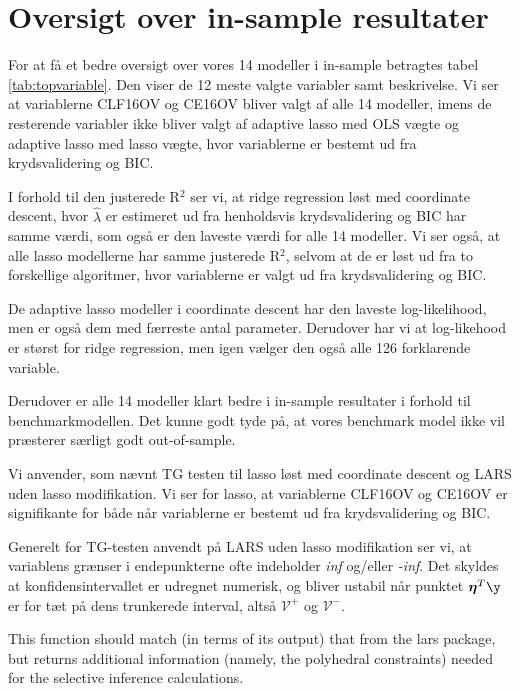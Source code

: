 \section{Oversigt over in-sample resultater} 
For at få et bedre oversigt over vores 14 modeller i in-sample betragtes tabel \ref{tab:topvariable}. Den viser de 12 meste valgte variabler samt beskrivelse. Vi ser at variablerne \textcolor{blue3}{CLF16OV} og \textcolor{blue3}{CE16OV} bliver valgt af alle 14 modeller, imens de resterende variabler ikke bliver valgt af adaptive lasso med OLS vægte og adaptive lasso med lasso vægte, hvor variablerne er bestemt ud fra  krydsvalidering og BIC. 



I forhold til den justerede R$^2$ ser vi, at ridge regression løst med coordinate descent, hvor $\widehat{\lambda}$ er estimeret ud fra henholdsvis krydsvalidering og BIC har samme værdi, som også er den laveste værdi for alle 14 modeller. 
Vi ser også, at alle lasso modellerne har samme justerede R$^2$, selvom at de er løst ud fra to forskellige algoritmer, hvor variablerne er valgt ud fra krydsvalidering og BIC. 

De adaptive lasso modeller i coordinate descent har den laveste log-likelihood, men er også dem med færreste antal parameter. Derudover har vi at log-likehood er størst for ridge regression, men igen vælger den også alle 126 forklarende variable. 

Derudover er alle 14 modeller klart bedre i in-sample resultater i forhold til benchmarkmodellen. Det kunne godt tyde på, at vores benchmark model ikke vil præsterer særligt godt out-of-sample. 


Vi anvender, som nævnt TG testen til lasso løst med coordinate descent og LARS uden lasso modifikation. Vi ser for lasso, at variablerne \textcolor{blue3}{CLF16OV} og \textcolor{blue3}{CE16OV} er signifikante for både når variablerne er bestemt ud fra krydsvalidering og BIC. 

Generelt for TG-testen anvendt på LARS uden lasso modifikation ser vi, at variablens grænser i endepunkterne ofte indeholder \textit{inf} og/eller \textit{-inf}. 
Det skyldes at konfidensintervallet er udregnet numerisk, og bliver ustabil når punktet $\boldsymbol{\eta}^T \y$ er for tæt på dens trunkerede interval, altså $\mathcal{V^+}$ og $\mathcal{V^-}$. 




This function should match (in terms of its output) that from the lars package, but returns additional information (namely, the polyhedral constraints) needed for the selective inference calculations.







